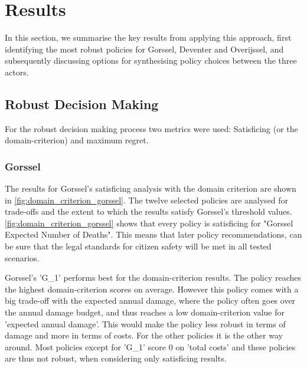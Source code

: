 \section{Results}
\label{s:results}

In this section, we summarise the key results from applying this approach, first identifying the most robust policies for Gorssel, Deventer and Overijssel, and subsequently discussing options for synthesising policy choices between the three actors. 

\subsection{Robust Decision Making}
For the robust decision making process two metrics were used: Satisficing (or the domain-criterion) and maximum regret. 
\subsubsection{Gorssel}
The results for Gorssel's satisficing analysis with the domain criterion are shown in \autoref{fig:domain_criterion_gorssel}. The twelve selected policies are analysed for trade-offs and the extent to which the results satisfy Gorssel's threshold values. \newline
\autoref{fig:domain_criterion_gorssel} shows that every policy is satisficing for "Gorssel Expected Number of Deaths". This means that later policy recommendations, can be sure that the legal standards for citizen safety will be met in all tested scenarios. \newline

\noindent Gorssel's 'G\_1' performs best for the domain-criterion results. The policy reaches the highest domain-criterion scores on average. However this policy comes with a big trade-off with the expected annual damage, where the policy often goes over the annual damage budget, and thus reaches a low domain-criterion value for 'expected annual damage'. This would make the policy less robust in terms of damage and more in terms of costs. For the other policies it is the other way around. Most policies except for 'G\_1' score 0 on 'total costs' and these policies are thus not robust, when considering only satisficing results.  \newline

